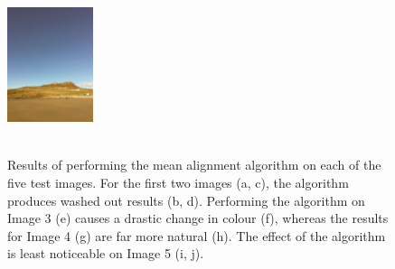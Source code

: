 \documentclass[journal,transmag]{IEEEtran}
\begin{document}
\begin{figure}[t]
{		\includegraphics[width=0.225\textwidth]{figures//images//image_03_changed.jpg}
	} 
	 \\
	 \\
\caption{Results of performing the mean alignment algorithm on each of the five test images.  For the first two images (a, c), the algorithm produces washed out results (b, d).  Performing the algorithm on Image 3 (e) causes a drastic change in colour (f), whereas the results for Image 4 (g) are far more natural (h).  The effect of the algorithm is least noticeable on Image 5 (i, j).}
\label{fig:results}
\end{figure}
\end{document}
